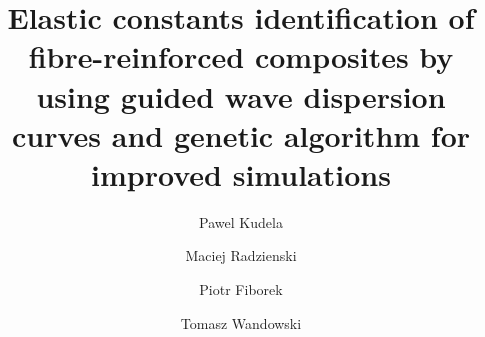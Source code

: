 \documentclass[preprint,12pt]{elsarticle}
\begin{document}
	\begin{frontmatter}
		
		\title{Elastic constants identification of fibre-reinforced composites by using guided wave dispersion curves and genetic algorithm for improved simulations}
		
		\address[IFFM]{Institute of Fluid Flow Machinery, Polish Academy of Sciences, Poland}
		
		\author{Pawel Kudela}
		\author{Maciej Radzienski}
		\author{Piotr Fiborek }
		\author{Tomasz Wandowski }	
		
		

\end{frontmatter}
\end{document}
